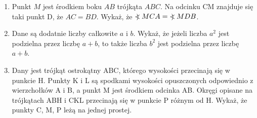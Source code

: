 \documentclass[10pt]{article}
\newcommand\Varangle{\mathop{{<\!\!\!\!\!\text{\small)}}\:}\nolimits}
\begin{document}
\begin{enumerate}
  \item Punkt \(M\) jest środkiem boku \(A B\) trójkąta \(A B C\). Na odcinku CM znajduje się taki punkt D, że \(A C=B D\). Wykaż, że \(\Varangle M C A=\Varangle M D B\).
  \item Dane są dodatnie liczby całkowite \(a\) i \(b\). Wykaż, że jeżeli liczba \(a^{2}\) jest podzielna przez liczbę \(a+b\), to także liczba \(b^{2}\) jest podzielna przez liczbę \(a+b\).
  \item Dany jest trójkąt ostrokątny ABC, którego wysokości przecinają się w punkcie H. Punkty K i L są spodkami wysokości opuszczonych odpowiednio z wierzchołków A i B, a punkt M jest środkiem odcinka AB. Okręgi opisane na trójkątach ABH i CKL przecinają się w punkcie P różnym od H. Wykaż, że punkty C, M, P leżą na jednej prostej.
\end{enumerate}
\end{document}
